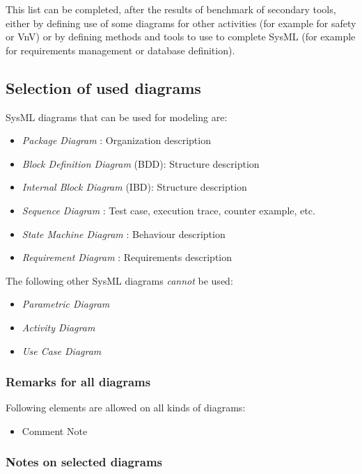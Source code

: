 This list can be completed, after the results of benchmark  of secondary tools, either by defining use of some diagrams for other activities (for example for safety or VnV) or by defining methods and tools to use to complete SysML (for example for requirements management or database definition).

\subsection{Selection of used diagrams}

SysML diagrams that can be used for modeling are:
\begin{itemize}
\item \emph{Package Diagram}   : Organization description
\item \emph{Block Definition Diagram}  (BDD): Structure description
\item \emph{Internal Block Diagram}  (IBD): Structure description
\item \emph{Sequence Diagram}  : Test case, execution trace, counter
  example, etc.
\item \emph{State Machine Diagram}  : Behaviour description
\item \emph{Requirement Diagram}  : Requirements description
\end{itemize}

The following other SysML diagrams \emph{cannot} be used:
\begin{itemize}
\item \emph{Parametric Diagram}
\item \emph{Activity Diagram}
\item \emph{Use Case Diagram}
\end{itemize}

\subsubsection{Remarks for all diagrams}

Following elements are allowed on all kinds of diagrams:
\begin{itemize}
\item Comment Note
\end{itemize}

\subsubsection{Notes on selected diagrams}

